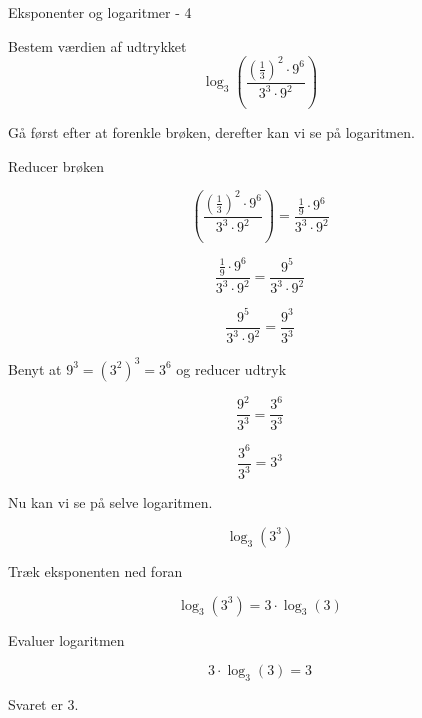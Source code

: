 \documentclass{article}
\begin{document}
\newpage
\begin{exercise}{Eksponenter og logaritmer - 4}
	
	Bestem værdien af udtrykket
	\[
	\log_3\left(\frac{\left(\frac{1}{3}\right)^2 \cdot 9^6}{3^3 \cdot 9^2} \right)
	\]
	
	
	\hint
	Gå først efter at forenkle brøken, derefter kan vi se på logaritmen.
	
	\hint
	Reducer brøken 
	
	\hint
	\[
	\left(\frac{\left(\frac{1}{3}\right)^2 \cdot 9^6}{3^3 \cdot 9^2} \right) = \frac{\frac{1}{9} \cdot 9^6}{3^3 \cdot 9^2}
	\]
	
	\hint
	\[
	\frac{\frac{1}{9} \cdot 9^6}{3^3 \cdot 9^2} = \frac{9^5}{3^3 \cdot 9^2}
	\]
	
	\hint
	\[
	 \frac{9^5}{3^3 \cdot 9^2} =  \frac{9^3}{3^3} 
	\]
	
	\hint
	Benyt at $9^3=(3^2)^3 = 3^6$ og reducer udtryk
	
	\hint
	\[
	\frac{9^2}{3^3} = \frac{3^6}{3^3} 
	\]
	
	\hint
	\[
	\frac{3^6}{3^3} = 3^3
	\]

	
	\hint
	Nu kan vi se på selve logaritmen.
	
	\hint
	\[
	\log_3\left(3^3\right)
	\]
	
	
	\hint
	Træk eksponenten ned foran
	
	\hint
	\[
	\log_3\left(3^{3}\right) = 3 \cdot \log_3(3)
	\]
	
	\hint
	Evaluer logaritmen
	
	\hint
	\[
	3 \cdot \log_3(3) = 3
	\]
	
	\hint
	Svaret er $3$.
	
\end{exercise}
\end{document}
